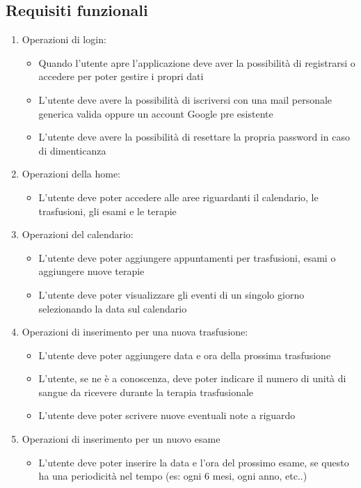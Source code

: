 \documentclass[12pt,a4paper,openright,twoside]{report}
\begin{document}
\subsection{Requisiti funzionali}
\begin{enumerate}
    \item Operazioni di login:
    \begin{itemize}
        \item Quando l'utente apre l'applicazione deve aver la possibilità di registrarsi o accedere per poter gestire i propri dati
        \item L'utente deve avere la possibilità di iscriversi con una mail personale generica valida oppure un account Google pre esistente
        \item L'utente deve avere la possibilità di resettare la propria password in caso di dimenticanza
    \end{itemize}
    \item Operazioni della home:
    \begin{itemize}
        \item L'utente deve poter accedere alle aree riguardanti il calendario, le trasfusioni, gli esami e le terapie
    \end{itemize}
    \item Operazioni del calendario:
    \begin{itemize}
        \item L'utente deve poter aggiungere appuntamenti per trasfusioni, esami o aggiungere nuove terapie
        \item L'utente deve poter visualizzare gli eventi di un singolo giorno selezionando la data sul calendario
    \end{itemize}
    \item Operazioni di inserimento per una nuova trasfusione:
    \begin{itemize}
        \item L'utente deve poter aggiungere data e ora della prossima trasfusione
        \item L'utente, se ne è a conoscenza, deve poter indicare il numero di unità di sangue da ricevere durante la terapia trasfusionale
        \item L'utente deve poter scrivere nuove eventuali note a riguardo
    \end{itemize}
    \item Operazioni di inserimento per un nuovo esame
    \begin{itemize}
        \item L'utente deve poter inserire la data e l'ora del prossimo esame, se questo ha una periodicità nel tempo (es: ogni 6 mesi, ogni anno, etc..)

\end{itemize}
\end{enumerate}
\end{document}
